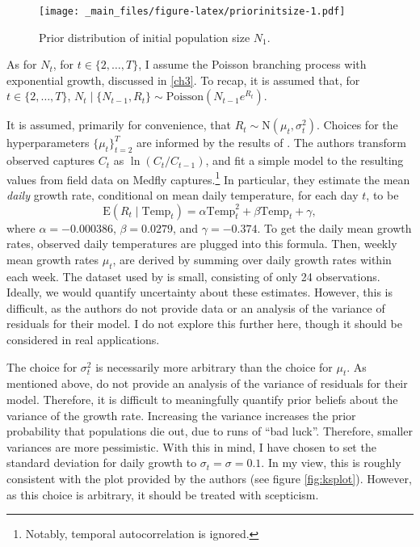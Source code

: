 \documentclass[
  oneside]{book}
\begin{document}
\begin{figure}
\centering
\texttt{[image: \_main\_files/figure-latex/priorinitsize-1.pdf]}
\caption{\label{fig:priorinitsize}Prior distribution of initial population size \(N_1\).}
\end{figure}

As for \(N_t\), for \(t \in \{2, \ldots, T\}\), I assume the Poisson branching process with exponential growth, discussed in \ref{ch3}. To recap, it is assumed that, for \(t \in \{2, \ldots, T\}\), \(N_t \mid \{ N_{t-1}, R_t \} \sim \mathrm{Poisson}(N_{t-1} e^{R_t})\).

It is assumed, primarily for convenience, that \(R_t \sim \mathrm N(\mu_t, \sigma^2_t)\). Choices for the hyperparameters \(\{\mu_t\}_{t=2}^T\) are informed by the results of \citet{ks2019}. The authors transform observed captures \(C_t\) as \(\ln (C_t / C_{t-1})\), and fit a simple model to the resulting values from field data on Medfly captures.\footnote{Notably, temporal autocorrelation is ignored.} In particular, they estimate the mean \emph{daily} growth rate, conditional on mean daily temperature, for each day \(t\), to be
\[
\mathrm E(R_t \mid \mathrm{Temp}_t) = \alpha \mathrm{Temp}_t^2 + \beta \mathrm{Temp}_t + \gamma,
\]
where \(\alpha = -0.000386\), \(\beta = 0.0279\), and \(\gamma = -0.374\). To get the daily mean growth rates, observed daily temperatures are plugged into this formula. Then, weekly mean growth rates \(\mu_t\), are derived by summing over daily growth rates within each week. The dataset used by \citet{ks2019} is small, consisting of only 24 observations. Ideally, we would quantify uncertainty about these estimates. However, this is difficult, as the authors do not provide data or an analysis of the variance of residuals for their model. I do not explore this further here, though it should be considered in real applications.

The choice for \(\sigma^2_t\) is necessarily more arbitrary than the choice for \(\mu_t\). As mentioned above, \citet{ks2019} do not provide an analysis of the variance of residuals for their model. Therefore, it is difficult to meaningfully quantify prior beliefs about the variance of the growth rate. Increasing the variance increases the prior probability that populations die out, due to runs of ``bad luck''. Therefore, smaller variances are more pessimistic. With this in mind, I have chosen to set the standard deviation for daily growth to \(\sigma_t = \sigma = 0.1\). In my view, this is roughly consistent with the plot provided by the authors (see figure \ref{fig:ksplot}). However, as this choice is arbitrary, it should be treated with scepticism.
\end{document}
